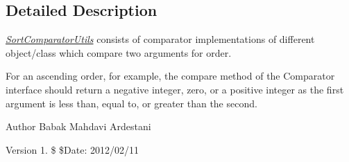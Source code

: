\subsection{Detailed Description}
{\itshape \hyperlink{classuk_1_1ac_1_1dmu_1_1iesd_1_1cascade_1_1market_1_1astem_1_1util_1_1_sort_comparator_utils}{Sort\-Comparator\-Utils}} consists of comparator implementations of different object/class which compare two arguments for order. 

For an ascending order, for example, the compare method of the Comparator interface should return a negative integer, zero, or a positive integer as the first argument is less than, equal to, or greater than the second.

\begin{DoxyAuthor}{Author}
Babak Mahdavi Ardestani 
\end{DoxyAuthor}
\begin{DoxyVersion}{Version}
1. \$ \$\-Date\-: 2012/02/11 
\end{DoxyVersion}


